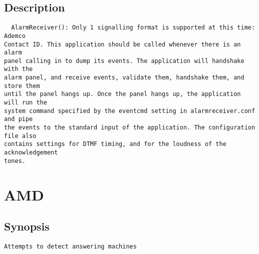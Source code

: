 \subsection{Description}
\begin{verbatim}
  AlarmReceiver(): Only 1 signalling format is supported at this time: Ademco
Contact ID. This application should be called whenever there is an alarm
panel calling in to dump its events. The application will handshake with the
alarm panel, and receive events, validate them, handshake them, and store them
until the panel hangs up. Once the panel hangs up, the application will run the
system command specified by the eventcmd setting in alarmreceiver.conf and pipe
the events to the standard input of the application. The configuration file also
contains settings for DTMF timing, and for the loudness of the acknowledgement
tones.

\end{verbatim}


\section{AMD}
\subsection{Synopsis}
\begin{verbatim}
Attempts to detect answering machines
\end{verbatim}
